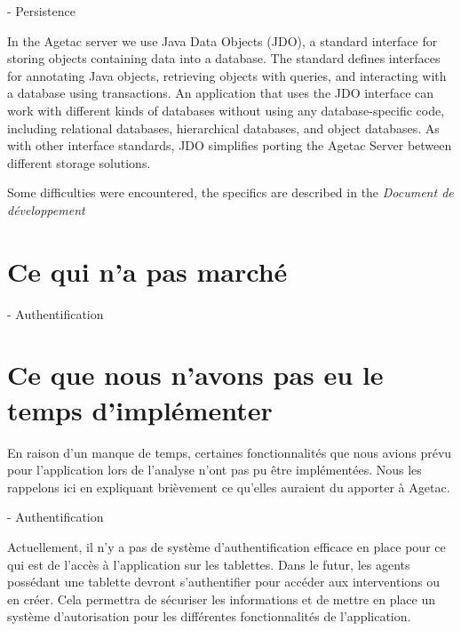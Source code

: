 \documentclass{article}
\begin{document}
\vspace{13pt}
\parindent=3pt
{\large {\color{color01} - Persistence}}

\vspace{13pt}
\parindent=0pt
{\color{color01} In the Agetac server we use Java Data Objects (JDO), a standard 
interface for storing objects containing data into a database. The standard defines 
interfaces for annotating Java objects, retrieving objects with queries, and interacting 
with a database using transactions. An application that uses the JDO interface 
can work with different kinds of databases without using any database-specific 
code, including relational databases, hierarchical databases, and object databases. 
As with other interface standards, JDO simplifies porting the Agetac Server between 
different storage solutions.}

\vspace{13pt}
{\color{color01} Some difficulties were encountered, the specifics are described 
in the }{\color{color01} \textit{Document de développement\label{h.ssdrr26ojh9l}}}

\vspace{24pt}
\section*{{\LARGE {\color{color01} \textbf{Ce qui n'a pas marché}}}}

\parindent=3pt
{\large {\color{color01} - Authentification\label{h.ifmwcz4cx8ke}}}

\vspace{37pt}
\section*{{\LARGE {\color{color01} \textbf{Ce que nous n'avons pas eu le temps 
d'implémenter}}}}

\vspace{27pt}
\parindent=0pt
{\color{color01} En raison d'un manque de temps, certaines fonctionnalités que 
nous avions prévu pour l'application lors de l'analyse n'ont pas pu être implémentées. 
Nous les rappelons ici en expliquant brièvement ce qu'elles auraient du apporter 
à Agetac.}

\vspace{13pt}
{\large {\color{color01} - Authentification}}

{\color{color01} Actuellement, il n'y a pas de système d'authentification efficace 
en place pour ce qui est de l'accès à l'application sur les tablettes. Dans le 
futur, les agents possédant une tablette devront s'authentifier pour accéder 
aux interventions ou en créer. Cela permettra de sécuriser les informations et 
de mettre en place un système d'autorisation pour les différentes fonctionnalités 
de l'application.}
\end{document}
